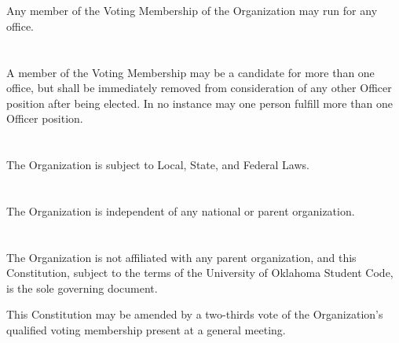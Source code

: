 \documentclass[12pt]{cls/constitution}
\begin{document}
\section{}
Any member of the Voting Membership of the Organization may run for any office.

\section{}
A member of the Voting Membership may be a candidate for more than one office, but shall be immediately removed from consideration of any other Officer position after being elected. In no instance may one person fulfill more than one Officer position. 


\section{}
The Organization is subject to Local, State, and Federal Laws.

\section{}
The Organization is independent of any national or parent organization.

\section{}
The Organization is not affiliated with any parent organization, and this Constitution, subject to the terms of the University of Oklahoma Student Code, is the sole governing document.

This Constitution may be amended by a two-thirds vote of the Organization’s qualified voting membership present at a general meeting. 
\end{document}
